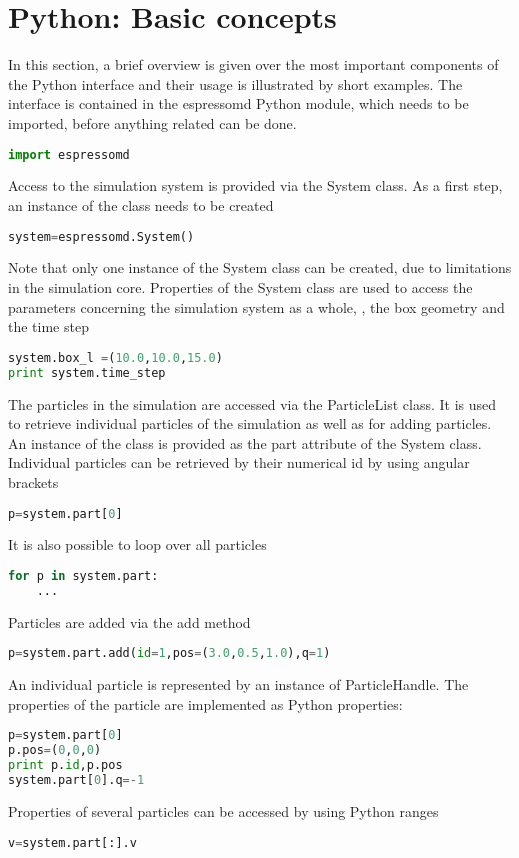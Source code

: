 \section{Python: Basic concepts}
In this section, a brief overview is given over the most important components of the Python interface and their usage is illustrated by short examples.
The interface is contained in the espressomd Python module, which needs to be imported, before anything \es related can be done.
\begin{lstlisting}[language=python]
import espressomd
\end{lstlisting}
Access to the simulation system is provided via the System class. As a first step, an instance of the class needs to be created
\begin{lstlisting}[language=python]
system=espressomd.System()
\end{lstlisting}
Note that only one instance of the System class can be created, due to limitations in the simulation core.
Properties of the System class are used to access the parameters concerning the simulation system as a whole, \eg, the box geometry and the time step
\begin{lstlisting}[language=python]
system.box_l =(10.0,10.0,15.0)
print system.time_step
\end{lstlisting}


The particles in the simulation are accessed via the ParticleList class. It is used to retrieve individual particles of the simulation as well as for adding particles.
An instance of the class is provided as the part attribute of the System class.
Individual particles can be retrieved by their numerical id by using angular brackets
\begin{lstlisting}[language=python]
p=system.part[0]
\end{lstlisting}
It is also possible to loop over all particles
\begin{lstlisting}[language=python]
for p in system.part:
    ...
\end{lstlisting}
Particles are added via the add method
\begin{lstlisting}[language=python]
p=system.part.add(id=1,pos=(3.0,0.5,1.0),q=1)
\end{lstlisting}
An individual particle is represented by an instance of ParticleHandle.
The properties of the particle are implemented as Python properties:
\begin{lstlisting}[language=python]
p=system.part[0]
p.pos=(0,0,0)
print p.id,p.pos
system.part[0].q=-1
\end{lstlisting}
Properties of several particles can be accessed by using Python ranges
\begin{lstlisting}[language=python]
v=system.part[:].v
\end{lstlisting}

